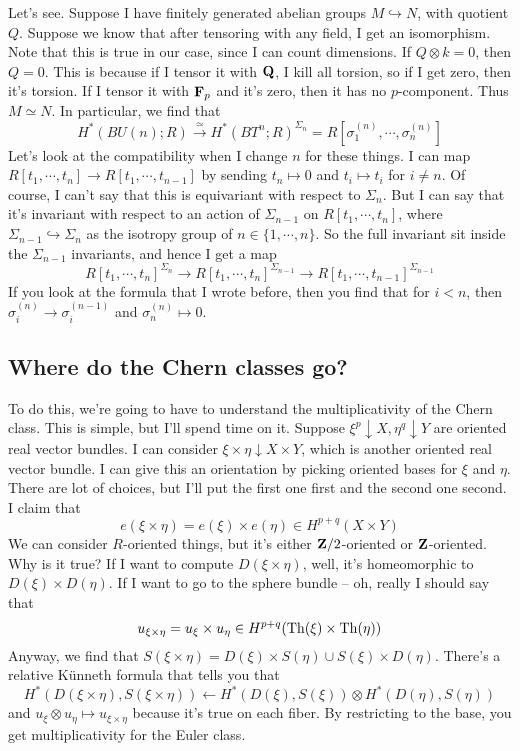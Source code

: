 Let's see.
Suppose I have finitely generated abelian groups $M\hookrightarrow N$, with quotient $Q$.
Suppose we know that after tensoring with any field, I get an isomorphism.
Note that this is true in our case, since I can count dimensions.
If $Q\otimes k = 0$, then $Q = 0$.
This is because if I tensor it with $\mathbf Q$, I kill all torsion, so if I get zero, then it's torsion.
If I tensor it with $\mathbf F_p$ and it's zero, then it has no $p$-component.
Thus $M\simeq N$.
In particular, we find that
$$
H^\ast(BU(n);R) \xrightarrow{\simeq} H^\ast(BT^n;R)^{\Sigma_n} = R[\sigma_1^{(n)},\cdots,\sigma_n^{(n)}]
$$
Let's look at the compatibility when I change $n$ for these things.
I can map $R[t_1,\cdots,t_n] \to R[t_1,\cdots,t_{n-1}]$ by sending $t_n\mapsto 0$ and $t_i\mapsto t_i$ for $i\neq n$.
Of course, I can't say that this is equivariant with respect to $\Sigma_n$.
But I can say that it's invariant with respect to an action of $\Sigma_{n-1}$ on $R[t_1,\cdots,t_n]$, where $\Sigma_{n-1}\hookrightarrow \Sigma_n$ as the isotropy group of $n\in\{1,\cdots,n\}$.
So the full invariant sit inside the $\Sigma_{n-1}$ invariants, and hence I get a map
$$
R[t_1,\cdots,t_n]^{\Sigma_n} \to R[t_1,\cdots,t_n]^{\Sigma_{n-1}} \to R[t_1,\cdots,t_{n-1}]^{\Sigma_{n-1}}
$$
If you look at the formula that I wrote before, then you find that for $i<n$, then $\sigma_i^{(n)} \to \sigma_i^{(n-1)}$ and $\sigma_n^{(n)} \mapsto 0$.
\subsection{Where do the Chern classes go?}
To do this, we're going to have to understand the multiplicativity of the Chern class.
This is simple, but I'll spend time on it.
Suppose $\xi^p\downarrow X,\eta^q\downarrow Y$ are oriented real vector bundles.
I can consider $\xi\times\eta\downarrow X\times Y$, which is another oriented real vector bundle.
I can give this an orientation by picking oriented bases for $\xi$ and $\eta$.
There are lot of choices, but I'll put the first one first and the second one second.
I claim that
$$
e(\xi\times\eta) = e(\xi)\times e(\eta) \in H^{p+q}(X\times Y)
$$
We can consider $R$-oriented things, but it's either $\mathbf Z/2$-oriented or $\mathbf Z$-oriented.
Why is it true?
If I want to compute $D(\xi\times\eta)$, well, it's homeomorphic to $D(\xi)\times D(\eta)$.
If I want to go to the sphere bundle -- oh, really I should say that
$$
u_{\xi\times \eta} = u_\xi\times u_\eta\in H^{p+q}(\operatorname{Th}(\xi)\times\operatorname{Th}(\eta))
$$
Anyway, we find that $S(\xi\times\eta) = D(\xi)\times S(\eta)\cup S(\xi)\times D(\eta)$.
There's a relative K\"unneth formula that tells you that
$$
H^\ast(D(\xi\times\eta),S(\xi\times\eta)) \leftarrow H^\ast(D(\xi),S(\xi))\otimes H^\ast(D(\eta),S(\eta))
$$
and $u_\xi\otimes u_\eta\mapsto u_{\xi\times\eta}$ because it's true on each fiber.
By restricting to the base, you get multiplicativity for the Euler class.

